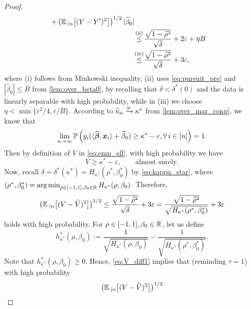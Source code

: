 \begin{proof}
\begin{align}
        + \left( \E_{\cdot | n}\bigl[(Y - Y')^2\bigr] \right)^{1/2} |\hat\beta_0|  \notag \\
        & \overset{\mathmakebox[0pt][c]{\text{(ii)}}}{\le} \frac{\sqrt{1 - \hat\rho^2}}{\sqrt{\delta}} + 2\varepsilon + \eta B \notag \\
        & \overset{\mathmakebox[0pt][c]{\text{(iii)}}}{\le} \frac{\sqrt{1 - \hat\rho^2}}{\sqrt{\delta}} + 3\varepsilon,
        \label{eq:V_diff0}
\end{align}
where (i) follows from Minkowski inequality, (ii) uses \cref{eq:pursuit_pre} and $|\hat\beta_0| \le B$ from \cref{lem:over_beta0}, by recalling that $\delta < \delta^*(0)$ and the data is linearly separable with high probability, while in (iii) we choose $\eta < \min\{ \varepsilon^2/4, \varepsilon/B \}$. According to $\widehat\kappa_n \xrightarrow{\mathrm{p}} \kappa^*$ from \cref{lem:over_mar_conp}, we know that
\begin{equation*}
    \lim_{n \to \infty} \mathbb{P}\left( y_i (\langle \widehat{{\boldsymbol{\beta}}} , \text{\boldmath $x$}_i \rangle + \widehat\beta_0 ) \ge \kappa^* - \varepsilon,
    \forall\, i \in [n] \right) = 1.
\end{equation*}
Then by definition of $V$ in \cref{eq:emp_ell}, with high probability we have 
\begin{equation}
    \label{eq:V_kappa_as}
    V \ge \kappa^* - \varepsilon,
    \qquad \text{almost surely}.
\end{equation}
Now, recall $\delta = \delta^*(\kappa^*) = H_{\kappa^*}(\rho^*, \beta_0^*)$ by \cref{eq:kappa_star}, where $(\rho^*, \beta_0^*) = \operatorname*{arg\,min}_{\rho \in [-1, 1], \beta_0 \in \mathbb{R}} H_{\kappa^*}(\rho, \beta_0)$. Therefore,
\begin{equation}
    \label{eq:V_diff1}
        \bigl( \mathbb{E}_{\cdot | n}\bigl[(V - \widehat V)^2\bigr] \bigr)^{1/2}
        \le \frac{\sqrt{1 - \widehat\rho^2}}{\sqrt{\delta}} + 3\varepsilon
        = \frac{\sqrt{1 - \widehat\rho^2}}{\sqrt{H_{\kappa^*}(\rho^*, \beta_0^*)}} + 3\varepsilon
\end{equation}
holds with high probability. For $\rho \in [-1, 1], \beta_0 \in \mathbb{R}$, let us define
\begin{equation*}
    h_{\kappa^*}^*(\rho, \beta_0) := \frac{1}{\sqrt{H_{\kappa^*}(\rho, \beta_0)}}
    - \frac{1}{\sqrt{H_{\kappa^*}(\rho^*, \beta_0^*)}}.
\end{equation*}
Note that $h_{\kappa^*}^*(\rho, \beta_0) \ge 0$. Hence, \cref{eq:V_diff1} implies that (reminding $\tau = 1$) with high probability
\begin{align*}
        \bigl( \E_{\cdot | n}\bigl[(V - \hat V)^2\bigr] \bigr)^{1/2}

\end{align*}
\end{proof}
